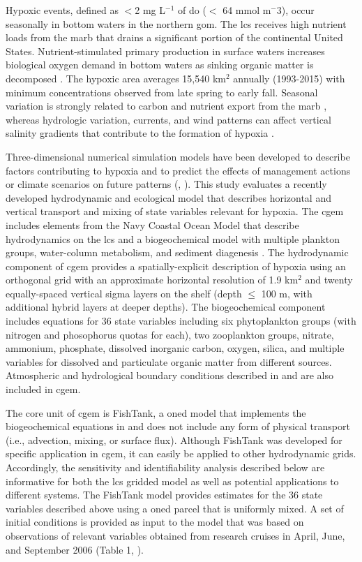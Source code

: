 \documentclass[letterpaper,12pt,oneside]{article}\usepackage[]{graphicx}\usepackage[]{color}
\begin{document}
Hypoxic events, defined  as $<$2 mg L$^{-1}$ of \ac{do} ($<$ 64 mmol m$^-3$), occur seasonally in bottom waters in the northern \ac{gom}.  The \ac{lcs} receives high nutrient loads from the \ac{marb} that drains a significant portion of the continental United States.  Nutrient-stimulated primary production in surface waters increases biological oxygen demand in bottom waters as sinking organic matter is decomposed \citep{Bierman94,Murrell13}.  The hypoxic area averages 15,540 km$^2$ annually (1993-2015) with minimum concentrations observed from late spring to early fall.  Seasonal variation is strongly related to carbon and nutrient export from the \ac{marb} \citep{Lohrenz08,Bianchi10}, whereas hydrologic variation, currents, and wind patterns can affect vertical salinity gradients that contribute to the formation of hypoxia \citep{Wiseman97,Paerl98,Obenour15}. 

Three-dimensional numerical simulation models have been developed to describe factors contributing to hypoxia and to predict the effects of management actions or climate scenarios on future patterns (\citealt{Fennel13,Pauer16}, ).  This study evaluates a recently developed hydrodynamic and ecological model that describes horizontal and vertical transport and mixing of state variables relevant for hypoxia.  The \ac{cgem} includes elements from the Navy Coastal Ocean Model \citep{Martin00} that describe hydrodynamics on the \ac{lcs} and a biogeochemical model with multiple plankton groups, water-column metabolism, and sediment diagenesis \citep{Eldridge10}.  The hydrodynamic component of \ac{cgem} provides a spatially-explicit description of hypoxia using an orthogonal grid with an approximate horizontal resolution of 1.9 km$^2$ and twenty equally-spaced vertical sigma layers on the shelf (depth $\leq$ 100 m, with additional hybrid layers at deeper depths).  The biogeochemical component includes equations for 36 state variables including six phytoplankton groups (with nitrogen and phosophorus quotas for each), two zooplankton groups, nitrate, ammonium, phosphate, dissolved inorganic carbon, oxygen, silica, and multiple variables for dissolved and particulate organic matter from different sources.  Atmospheric and hydrological boundary conditions described in \citet{Hodur97} and \citet{Lehrter13} are also included in \ac{cgem}.

The core unit of \ac{cgem} is FishTank, a \ac{oned} model that implements the biogeochemical equations in \citet{Eldridge10} and does not include any form of physical transport (i.e., advection, mixing, or surface flux).  Although FishTank was developed for specific application in \ac{cgem}, it can easily be applied to other hydrodynamic grids. Accordingly, the sensitivity and identifiability analysis described below are informative for both the \ac{lcs} gridded model as well as potential applications to different systems.  The FishTank model provides estimates for the 36 state variables described above using a \ac{oned} parcel that is uniformly mixed.  A set of initial conditions is provided as input to the model that was based on observations of relevant variables obtained from research cruises in April, June, and September 2006 (Table 1, \citet{Murrell14}). 
\end{document}
